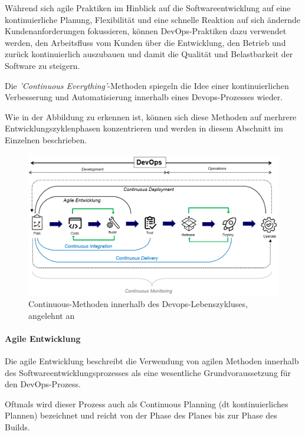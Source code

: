 Während sich agile Praktiken im Hinblick auf die Softwareentwicklung auf eine kontinuierliche Planung, Flexibilität und eine schnelle Reaktion auf sich ändernde Kundenanforderungen fokussieren, können DevOps-Praktiken dazu verwendet werden, den Arbeitsfluss vom Kunden über die Entwicklung, den Betrieb und zurück kontinuierlich auszubauen und damit die Qualität und Belastbarkeit der Software zu steigern. \cite{fitzgerald_continuous_2014} \cite[S. 264]{tokarski_strategische_2018}

Die \textit{'Continuous Everything'}-Methoden spiegeln die Idee einer kontinuierlichen Verbesserung und Automatisierung innerhalb eines Devops-Prozesses wieder. 

Wie in der Abbildung zu erkennen ist, können sich diese Methoden auf merhrere Entwicklungszyklenphasen konzentrieren und werden in diesem Abschnitt im Einzelnen beschrieben.  

\begin{figure}[h]
    \centering
    \includegraphics[scale=0.6]{Bilder/Continuous Everything.png}
    \caption{Continuous-Methoden innerhalb des Devops-Lebenszykluses, angelehnt an \cite[S. 16]{halstenberg_devops_2020}}
\end{figure}

\paragraph{Agile Entwicklung}

Die agile Entwicklung beschreibt die Verwendung von agilen Methoden innerhalb des Softwareentwicklungsprozesses als eine wesentliche Grundvoraussetzung für den DevOps-Prozess. 

Oftmals wird dieser Prozess auch als Continuous Planning (dt kontinuierliches Plannen) bezeichnet und reicht von der Phase des Planes bis zur Phase des Builds. \cite{fitzgerald_continuous_2014} 

